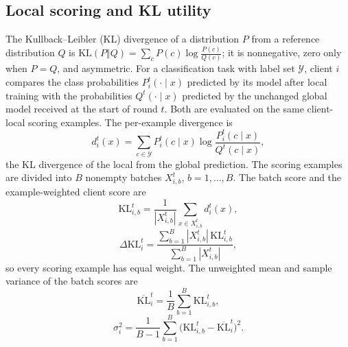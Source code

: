 \documentclass[pdflatex,sn-basic]{sn-jnl}
\newcommand{\KL}{\Delta\mathrm{KL}}
\begin{document}
\subsection{Local scoring and KL utility}\label{sec4.2}
The Kullback--Leibler (KL) divergence \citep{kullback1951} of a distribution $P$ from a reference distribution $Q$ is $\mathrm{KL}(P\Vert Q)=\sum_{c}P(c)\log\frac{P(c)}{Q(c)}$; it is nonnegative, zero only when $P=Q$, and asymmetric. For a classification task with label set $\mathcal{Y}$, client $i$ compares the class probabilities $P_i^t(\cdot\mid x)$ predicted by its model after local training with the probabilities $Q^t(\cdot\mid x)$ predicted by the unchanged global model received at the start of round $t$. Both are evaluated on the same client-local scoring examples. The per-example divergence is
\begin{equation}\label{eq:kld}
d_i^t(x)=\sum_{c\in\mathcal{Y}}P_i^t(c\mid x)\log\frac{P_i^t(c\mid x)}{Q^t(c\mid x)} ,
\end{equation}
the KL divergence of the local from the global prediction. The scoring examples are divided into $B$ nonempty batches $X_{i,b}^t$, $b=1,\dots,B$. The batch score and the example-weighted client score are
\begin{equation}\label{eq:klb}
\mathrm{KL}_{i,b}^t=\frac{1}{|X_{i,b}^t|}\sum_{x\in X_{i,b}^t}d_i^t(x),
\end{equation}
\begin{equation}\label{eq:kl}
\KL_i^t=\frac{\sum_{b=1}^{B}|X_{i,b}^t|\,\mathrm{KL}_{i,b}^t}{\sum_{b=1}^{B}|X_{i,b}^t|},
\end{equation}
so every scoring example has equal weight. The unweighted mean and sample variance of the batch scores are
\begin{equation}\label{eq:klmean}
\overline{\mathrm{KL}}_i^t=\frac{1}{B}\sum_{b=1}^{B}\mathrm{KL}_{i,b}^t,
\end{equation}
\begin{equation}\label{eq:var}
\sigma_i^2=\frac{1}{B-1}\sum_{b=1}^{B}\bigl(\mathrm{KL}_{i,b}^t-\overline{\mathrm{KL}}_i^t\bigr)^2 .
\end{equation}
\end{document}
